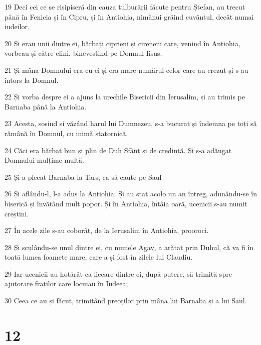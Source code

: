 \par 19 Deci cei ce se risipiseră din cauza tulburării făcute pentru Ștefan, au trecut până în Fenicia și în Cipru, și în Antiohia, nimănui grăind cuvântul, decât numai iudeilor.
\par 20 Și erau unii dintre ei, bărbați ciprieni și cireneni care, venind în Antiohia, vorbeau și către elini, binevestind pe Domnul Iisus.
\par 21 Și mâna Domnului era cu ei și era mare numărul celor care au crezut și s-au întors la Domnul.
\par 22 Și vorba despre ei a ajuns la urechile Bisericii din Ierusalim, și au trimis pe Barnaba până la Antiohia.
\par 23 Acesta, sosind și văzând harul lui Dumnezeu, s-a bucurat și îndemna pe toți să rămână în Domnul, cu inimă statornică.
\par 24 Căci era bărbat bun și plin de Duh Sfânt și de credință. Și s-a adăugat Domnului mulțime multă.
\par 25 Și a plecat Barnaba la Tars, ca să caute pe Saul
\par 26 Și aflându-l, l-a adus la Antiohia. Și au stat acolo un an întreg, adunându-se în biserică și învățând mult popor. Și în Antiohia, întâia oară, ucenicii s-au numit creștini.
\par 27 În acele zile s-au coborât, de la Ierusalim în Antiohia, prooroci.
\par 28 Și sculându-se unul dintre ei, cu numele Agav, a arătat prin Duhul, că va fi în toată lumea foamete mare, care a și fost în zilele lui Claudiu.
\par 29 Iar ucenicii au hotărât ca fiecare dintre ei, după putere, să trimită spre ajutorare fraților care locuiau în Iudeea;
\par 30 Ceea ce au și făcut, trimițând preoților prin mâna lui Barnaba și a lui Saul.

\chapter{12}

